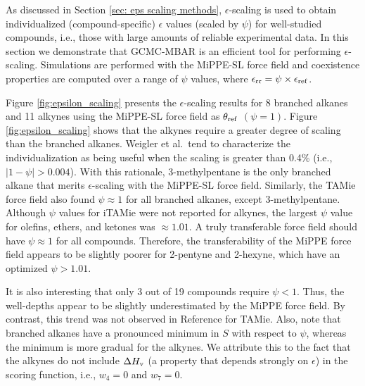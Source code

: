 \documentclass[journal=jced,manuscript=article]{achemso}
\begin{document}

As discussed in Section \ref{sec: eps scaling methods}, $\epsilon$-scaling is used to obtain individualized (compound-specific) $\epsilon$ values (scaled by $\psi$) for well-studied compounds, i.e., those with large amounts of reliable experimental data. \cite{Weidler2018} In this section we demonstrate that GCMC-MBAR is an efficient tool for performing $\epsilon$-scaling. Simulations are performed with the MiPPE-SL force field and coexistence properties are computed over a range of $\psi$ values, where $\epsilon_{\rm rr} = \psi \times \epsilon_{\rm ref}$.

Figure \ref{fig:epsilon_scaling} presents the $\epsilon$-scaling results for 8 branched alkanes and 11 alkynes using the MiPPE-SL force field as $\theta_{\rm ref}$ $(\psi = 1)$. Figure \ref{fig:epsilon_scaling} shows that the alkynes require a greater degree of scaling than the branched alkanes. Weigler et al.~tend to characterize the individualization as being useful when the scaling is greater than 0.4\% (i.e., $|1 - \psi| > 0.004$). With this rationale, 3-methylpentane is the only branched alkane that merits $\epsilon$-scaling with the MiPPE-SL force field. Similarly, the TAMie force field also found $\psi \approx 1$ for all branched alkanes, except 3-methylpentane. Although $\psi$ values for iTAMie were not reported for alkynes, the largest $\psi$ value for olefins, ethers, and ketones was $\approx 1.01$. A truly transferable force field should have $\psi \approx 1$ for all compounds. Therefore, the transferability of the MiPPE force field appears to be slightly poorer for 2-pentyne and 2-hexyne, which have an optimized $\psi > 1.01$. 

It is also interesting that only 3 out of 19 compounds require $\psi < 1$. Thus, the well-depths appear to be slightly underestimated by the MiPPE force field. By contrast, this trend was not observed in Reference  for TAMie. Also, note that branched alkanes have a pronounced minimum in $S$ with respect to $\psi$, whereas the minimum is more gradual for the alkynes. We attribute this to the fact that the alkynes do not include $\Delta H_{\rm v}$ (a property that depends strongly on $\epsilon$) in the scoring function, i.e., $w_4 = 0$ and $w_7 = 0$. 
\end{document}
